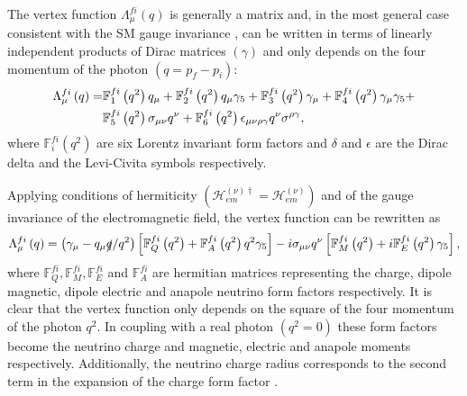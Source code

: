 The vertex function $\Lambda^{fi}_{\mu}\left(q\right)$ is generally a matrix and, in the most general case consistent with the \gls{SM} gauge invariance \cite{MostGeneralNuElmagVectorFunctionExpressionKayser.pdf, MostGeneralNuElmagVectorFunctionExpressionNieves.pdf}, can be written in terms of linearly independent products of Dirac matrices $\left(\gamma\right)$ and only depends on the four momentum of the photon $\left(q=p_f-p_i\right)$:
\begin{align}
\Lambda^{fi}_{\mu}\left(q\right)=&
\mathbb{F}^{fi}_1\left(q^2\right)q_{\mu}+
\mathbb{F}^{fi}_2\left(q^2\right)q_{\mu}\gamma_5+
\mathbb{F}^{fi}_3\left(q^2\right)\gamma_{\mu}+
\mathbb{F}^{fi}_4\left(q^2\right)\gamma_{\mu}\gamma_5+\notag\\ &
\mathbb{F}^{fi}_5\left(q^2\right)\sigma_{\mu\nu}q^{\nu}+
\mathbb{F}^{fi}_6\left(q^2\right)\epsilon_{\mu\nu\rho\gamma}q^{\nu}\sigma^{\rho\gamma},
\end{align}
where $\mathbb{F}^{fi}_i\left(q^2\right)$ are six Lorentz invariant form factors and $\delta$ and $\epsilon$ are the Dirac delta and the Levi-Civita symbols respectively.

Applying conditions of hermiticity $\left(\mathcal{H}^{\left(\nu\right)\dagger}_{em}=\mathcal{H}^{\left(\nu\right)}_{em}\right)$ and of the gauge invariance of the electromagnetic field, the vertex function can be rewritten as
\begin{equation}
\Lambda^{fi}_{\mu}\left(q\right)=
\left(\gamma_{\mu}-q_{\mu}\slashed{q}/q^2\right)\left[
\mathbb{F}^{fi}_{Q}\left(q^2\right)+\mathbb{F}^{fi}_{A}\left(q^2\right)q^2\gamma_5\right]-
i\sigma_{\mu\nu}q^{\nu}\left[\mathbb{F}^{fi}_{M}\left(q^2\right)+i\mathbb{F}^{fi}_{E}\left(q^2\right)\gamma_5\right], 
\end{equation}
where $\mathbb{F}^{fi}_Q,\mathbb{F}^{fi}_M,\mathbb{F}^{fi}_E$ and $\mathbb{F}^{fi}_A$ are hermitian matrices representing the charge, dipole magnetic, dipole electric and anapole neutrino form factors respectively. It is clear that the vertex function only depends on the square of the four momentum of the photon $q^2$. In coupling with a real photon $\left(q^2=0\right)$ these form factors become the neutrino charge and magnetic, electric and anapole moments respectively. Additionally, the neutrino charge radius corresponds to the second term in the expansion of the charge form factor \cite{nuElmagInt2015.pdf}.

